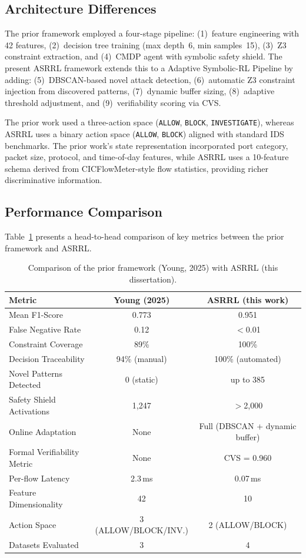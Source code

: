 \documentclass[12pt, letterpaper, oneside]{report}
\newcommand{\ASRRL}{\textsc{ASRRL}}
\begin{document}
\subsection{Architecture Differences}

The prior framework employed a four-stage pipeline: (1)~feature engineering with 42 features, (2)~decision tree training (max depth~6, min samples~15), (3)~Z3 constraint extraction, and (4)~CMDP agent with symbolic safety shield. The present \ASRRL{} framework extends this to a Adaptive Symbolic-RL Pipeline by adding: (5)~DBSCAN-based novel attack detection, (6)~automatic Z3 constraint injection from discovered patterns, (7)~dynamic buffer sizing, (8)~adaptive threshold adjustment, and (9)~verifiability scoring via CVS.

The prior work used a three-action space (\texttt{ALLOW}, \texttt{BLOCK}, \texttt{INVESTIGATE}), whereas \ASRRL{} uses a binary action space (\texttt{ALLOW}, \texttt{BLOCK}) aligned with standard IDS benchmarks. The prior work's state representation incorporated port category, packet size, protocol, and time-of-day features, while \ASRRL{} uses a 10-feature schema derived from CICFlowMeter-style flow statistics, providing richer discriminative information.

\subsection{Performance Comparison}

Table~\ref{tab:prior_vs_asrrl} presents a head-to-head comparison of key metrics between the prior framework and \ASRRL{}.

\begin{table}[htbp]
\centering
\caption{Comparison of the prior framework (Young, 2025) with \ASRRL{} (this dissertation).}
\label{tab:prior_vs_asrrl}
\small
\begin{tabular}{lcc}
\toprule
\textbf{Metric} & \textbf{Young (2025)} & \textbf{ASRRL (this work)} \\
\midrule
Mean F1-Score & 0.773 & 0.951 \\
False Negative Rate & 0.12 & $<$0.01 \\
Constraint Coverage & 89\% & 100\% \\
Decision Traceability & 94\% (manual) & 100\% (automated) \\
Novel Patterns Detected & 0 (static) & up to 385 \\
Safety Shield Activations & 1,247 & $>$2,000 \\
Online Adaptation & None & Full (DBSCAN + dynamic buffer) \\
Formal Verifiability Metric & None & CVS = 0.960 \\
Per-flow Latency & 2.3\,ms & 0.07\,ms \\
Feature Dimensionality & 42 & 10 \\
Action Space & 3 (ALLOW/BLOCK/INV.) & 2 (ALLOW/BLOCK) \\
Datasets Evaluated & 3 & 4 \\
\bottomrule
\end{tabular}
\end{table}
\end{document}
